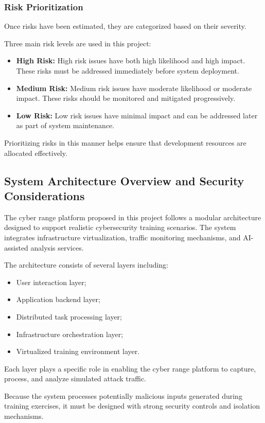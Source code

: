 \subsubsection{Risk Prioritization}
Once risks have been estimated, they are categorized based on their severity.

Three main risk levels are used in this project:

\begin{itemize}
    \item \textbf{High Risk:} High risk issues have both high likelihood and high impact. These risks must be addressed immediately before system deployment.
    \item \textbf{Medium Risk:} Medium risk issues have moderate likelihood or moderate impact. These risks should be monitored and mitigated progressively.
    \item \textbf{Low Risk:} Low risk issues have minimal impact and can be addressed later as part of system maintenance.
\end{itemize}

Prioritizing risks in this manner helps ensure that development resources are allocated effectively.

\subsection{System Architecture Overview and Security Considerations}
The cyber range platform proposed in this project follows a modular architecture designed to support realistic cybersecurity training scenarios. The system integrates infrastructure virtualization, traffic monitoring mechanisms, and AI-assisted analysis services.

The architecture consists of several layers including:
\begin{itemize}
    \item User interaction layer;
    \item Application backend layer;
    \item Distributed task processing layer;
    \item Infrastructure orchestration layer;
    \item Virtualized training environment layer.
\end{itemize}
Each layer plays a specific role in enabling the cyber range platform to capture, process, and analyze simulated attack traffic.

Because the system processes potentially malicious inputs generated during training exercises, it must be designed with strong security controls and isolation mechanisms.

